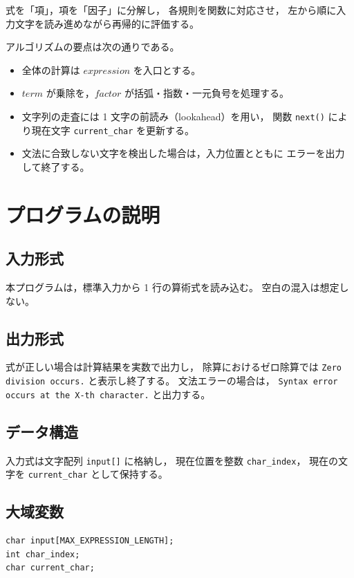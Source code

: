 \documentclass[a4paper,12pt]{jsarticle}
\begin{document}
式を「項」，項を「因子」に分解し，
各規則を関数に対応させ，
左から順に入力文字を読み進めながら再帰的に評価する。

アルゴリズムの要点は次の通りである。

\begin{itemize}
    \item 全体の計算は $expression$ を入口とする。
    \item $term$ が乗除を，$factor$ が括弧・指数・一元負号を処理する。
    \item 文字列の走査には 1 文字の前読み（lookahead）を用い，
    関数 \verb|next()| により現在文字 \verb|current_char| を更新する。
    \item 文法に合致しない文字を検出した場合は，入力位置とともに
    エラーを出力して終了する。
\end{itemize}

\section{プログラムの説明}

\subsection{入力形式}
本プログラムは，標準入力から 1 行の算術式を読み込む。
空白の混入は想定しない。

\subsection{出力形式}
式が正しい場合は計算結果を実数で出力し，
除算におけるゼロ除算では
\verb|Zero division occurs.| と表示し終了する。
文法エラーの場合は，
\verb|Syntax error occurs at the X-th character.| と出力する。

\subsection{データ構造}
入力式は文字配列 \verb|input[]| に格納し，
現在位置を整数 \verb|char_index|，
現在の文字を \verb|current_char| として保持する。

\subsection{大域変数}
\begin{verbatim}
char input[MAX_EXPRESSION_LENGTH];
int char_index;
char current_char;
\end{verbatim}
\end{document}
